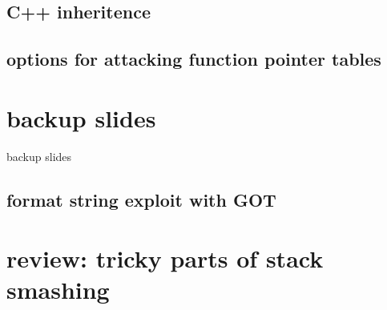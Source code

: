 \subsection{C++ inheritence}


\subsection{options for attacking function pointer tables}


\section{backup slides}
\begin{frame}{backup slides}
\end{frame}
\subsection{format string exploit with GOT}


\section{review: tricky parts of stack smashing}


